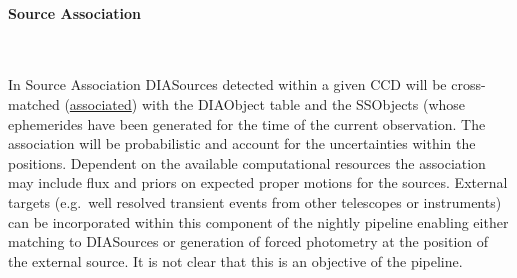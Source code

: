 \paragraph{Source Association}~

In Source Association DIASources detected within a given CCD will be cross-matched (\hyperref[sec:acDIAObjectGeneration]{associated}) with the DIAObject table and the SSObjects (whose ephemerides have been generated for the time of the current observation. The association will be probabilistic  and account for the uncertainties within the positions. Dependent on the available computational resources the association may include flux and priors on expected proper motions for the sources. External targets (e.g.\ well resolved transient events from other telescopes or instruments) can be incorporated within this component of the nightly pipeline enabling either matching to DIASources or generation of forced photometry at the position of the external source. It is not clear that this is an objective of the pipeline. 


